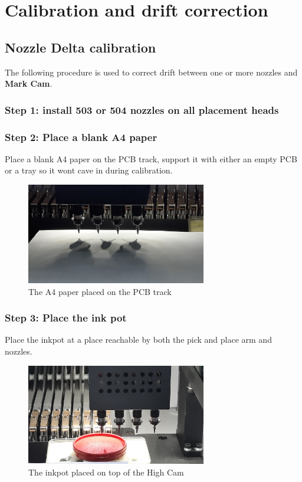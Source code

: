 \documentclass[a4paper,10pt]{report}
\begin{document}
\section{Calibration and drift correction}
\subsection{Nozzle Delta calibration}
The following procedure is used to correct drift between one or more nozzles and \textbf{Mark Cam}.
\subsubsection{Step 1: install 503 or 504 nozzles on all placement heads}
\subsubsection{Step 2: Place a blank A4 paper}
Place a blank A4 paper on the PCB track, support it with either an empty PCB or a tray so it wont cave in during calibration.
 \begin{figure}[!htb]
 \centering
 \includegraphics[width=0.7\textwidth]{images/a4.jpg}
 \caption{The A4 paper placed on the PCB track}
\end{figure}

\subsubsection{Step 3: Place the ink pot}
Place the inkpot at a place reachable by both the pick and place arm and nozzles.
 \begin{figure}[!htb]
 \centering
 \includegraphics[width=0.7\textwidth]{images/inkpot.jpg}
 \caption{The inkpot placed on top of the High Cam}
\end{figure}
\newpage
\end{document}
